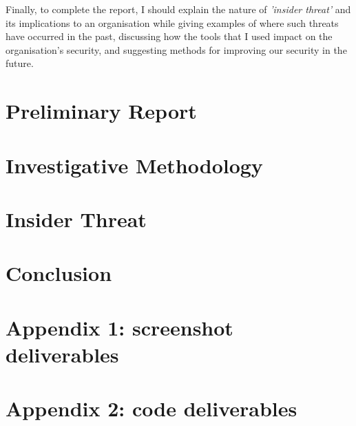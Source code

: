 \documentclass[12pt]{article}
\begin{document}
Finally, to complete the report, I should explain the nature of \textit{'insider threat'} and its implications to an organisation while giving examples of where such threats have occurred in the past, discussing how the tools that I used impact on the organisation's security, and suggesting methods for improving our security in the future.


\pagebreak
\section{Preliminary Report}

\pagebreak
\section{Investigative Methodology}

\pagebreak
\section{Insider Threat}

\pagebreak
\section{Conclusion}




\pagebreak
\nocite{example:referenceid:here}

\begin{flushleft}
  
\end{flushleft}


\appendix

\pagebreak
\section{Appendix 1: screenshot deliverables}

\pagebreak
\section{Appendix 2: code deliverables}
\end{document}
